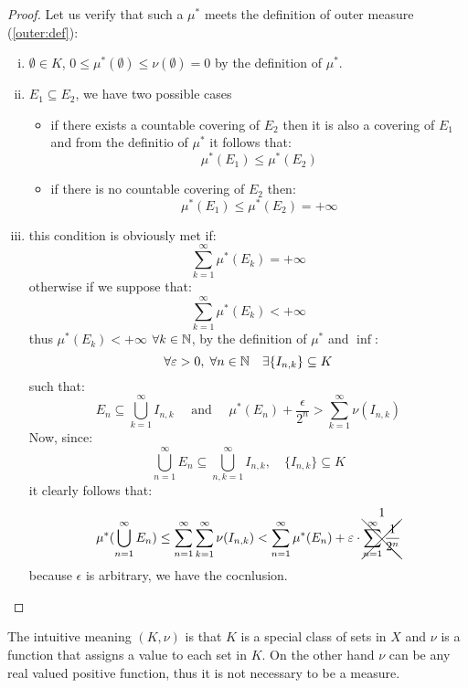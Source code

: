 \begin{proof}
    Let us verify that such a $\mu^*$ meets the definition of outer measure (\ref{outer:def}):
    \begin{enumerate}[i)]
        \item $\emptyset\in K$, $0\leq\mu^*(\emptyset)\leq\nu(\emptyset)=0$ by the definition of $\mu^*$.
        \item $E_1\subseteq E_2$, we have two possible cases
              \begin{itemize}
                  \item if there exists a countable covering of $E_2$ then it is also a covering of $E_1$ and from the definitio of $\mu^*$ it follows that:
                        \[
                            \mu^*(E_1) \leq \mu^*(E_2)
                        \]
                  \item if there is no countable covering of $E_2$ then:
                        \[
                            \mu^*(E_1) \leq \mu^*(E_2) = +\infty
                        \]
              \end{itemize}
        \item this condition is obviously met if:
              \[
                  \sum_{k=1}^{\infty} \mu^*(E_k) = +\infty
              \]
              otherwise if we suppose that:
              \[
                  \sum_{k=1}^{\infty} \mu^*(E_k) < +\infty
              \]
              thus $\mu^*(E_k)<+\infty$ $\forall k\in\mathbb{N}$, by the definition of $\mu^*$ and $\inf$:
              \[
                  \forall \varepsilon>0, \; \forall n\in\mathbb{N} \quad \exists \{ I_{n,k} \} \subseteq K
              \]
              such that:
              \[
                  E_n \subseteq \bigcup_{k=1}^{\infty} I_{n,k} \quad \text{ and } \quad \mu^*(E_n)+\frac{\epsilon}{2^n} > \sum_{k=1}^{\infty} \nu(I_{n,k})
              \]
              Now, since:
              \[
                  \bigcup_{n=1}^{\infty} E_n \subseteq \bigcup_{n,k=1}^{\infty} I_{n,k}, \quad \{ I_{n,k} \} \subseteq K
              \]
              it clearly follows that:
              \[
                  \mu^*(\bigcup_{n=1}^{\infty} E_n) \leq \sum_{n=1}^{\infty} \sum_{k=1}^{\infty} \nu(I_{n,k}) < \sum_{n=1}^{\infty}\mu^*(E_n) + \varepsilon\cdot\overset{\text{\normalsize1}}{\xcancel{\sum_{n=1}^{\infty} \frac{1}{2^n}}}
              \]
              because $\epsilon$ is arbitrary, we have the cocnlusion.
    \end{enumerate}
\end{proof}

The intuitive meaning $(K,\nu)$ is that $K$ is a special class of sets in $X$ and $\nu$ is a function that assigns a value to each set in $K$. On the other hand $\nu$ can be any real valued positive function, thus it is not necessary to be a measure.

